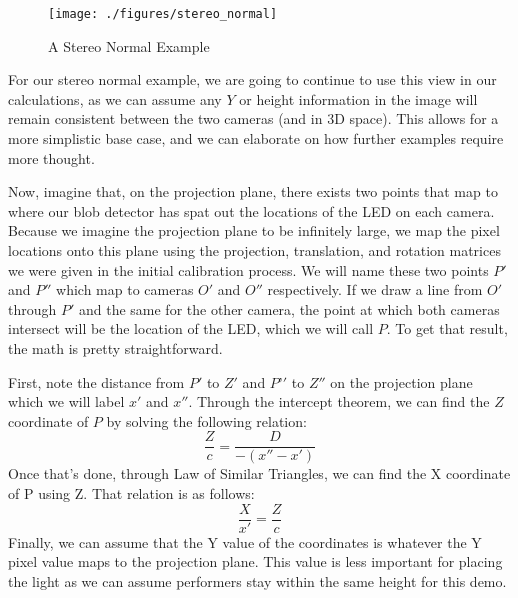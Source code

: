 \documentclass[12pt,twoside]{reedthesis}
\begin{document}
	\begin{figure}[h]
	   
	       \centering
	        
	    \texttt{[image: ./figures/stereo\_normal]}
	     \caption{A Stereo Normal Example}
	 \label{A Stereo Normal Example}
	\end{figure}

For our stereo normal example, we are going to continue to use this view in our calculations, as we can assume any $Y$ or height information in the image will remain consistent between the two cameras (and in 3D space). This allows for a more simplistic base case, and we can elaborate on how further examples require more thought.

Now, imagine that, on the projection plane, there exists two points that map to where our blob detector has spat out the locations of the LED on each camera. Because we imagine the projection plane to be infinitely large, we map the pixel locations onto this plane using the projection, translation, and rotation matrices we were given in the initial calibration process. We will name these two points $P'$ and $P''$ which map to cameras $O'$ and $O''$ respectively. If we draw a line from $O'$ through $P'$ and the same for the other camera, the point at which both cameras intersect will be the location of the LED, which we will call $P$. To get that result, the math is pretty straightforward.

First, note the distance from $P'$ to $Z'$ and $P’'$ to $Z''$ on the projection plane which we will label $x'$ and $x''$. Through the intercept theorem, we can find the $Z$ coordinate of $P$ by solving the following relation:
\[\frac{Z}{c} = \frac{D}{-(x'' - x')}\]
Once that's done, through Law of Similar Triangles, we can find the X coordinate of P using Z. That relation is as follows:
\[\frac{X}{x'}=\frac{Z}{c}\]
Finally, we can assume that the Y value of the coordinates is whatever the Y pixel value maps to the projection plane. This value is less important for placing the light as we can assume performers stay within the same height for this demo.
\end{document}
